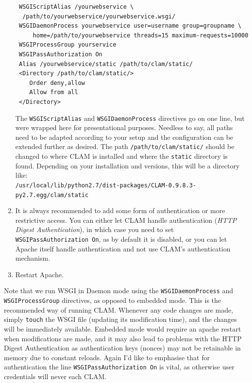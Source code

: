 \documentclass[a4paper,12pt]{report}
\begin{document}
\begin{enumerate}
\begin{verbatim}
 WSGIScriptAlias /yourwebservice \
  /path/to/yourwebservice/yourwebservice.wsgi/
 WSGIDaemonProcess yourwebservice user=username group=groupname \
     home=/path/to/yourwebservice threads=15 maximum-requests=10000
 WSGIProcessGroup yourservice
 WSGIPassAuthorization On
 Alias /yourwebservice/static /path/to/clam/static/ 
 <Directory /path/to/clam/static/>
    Order deny,allow
    Allow from all
 </Directory>
\end{verbatim}

The \texttt{WSGIScriptAlias} and \texttt{WSGIDaemonProcess} directives go on
one line, but were wrapped here
for presentational purposes. Needless to say, all paths need to be adapted
according to your setup and the configuration can be extended further as
desired. The path \texttt{/path/to/clam/static/} should be changed to where CLAM is
installed and where the \texttt{static} directory is found. Depending on your
installation and versions, this will be a directory like: \\
\texttt{/usr/local/lib/python2.7/dist-packages/CLAM-0.9.8.3-py2.7.egg/clam/static}

\item It is always recommended to add some form of authentication or more restrictive
  access. You can either let CLAM handle authentication (\emph{HTTP Digest
  Authentication}), in which case you need to set \texttt{WSGIPassAuthorization
  On}, as by default it is disabled, or you can let Apache itself handle
  authentication and not use CLAM's authentication mechanism.  

\item Restart Apache. 
\end{enumerate}

Note that we run WSGI in Daemon mode using the \texttt{WSGIDaemonProcess} and
\texttt{WSGIProcessGroup} directives, as opposed to embedded mode. This is the
recommended way of running CLAM. Whenever any code changes are made, simply
\texttt{touch} the WSGI file (updating its modification time), and the changes
will be immediately available. Embedded mode would require an apache restart
when modifications are made, and it may also lead to problems with the HTTP
Digest Authentication as authentication keys (nonces) may not be retainable in
memory due to constant reloads. Again I'd like to emphasise that for
authentication the line \texttt{WSGIPassAuthorization On} is vital, as
otherwise user credentials will never each CLAM.
\end{document}
